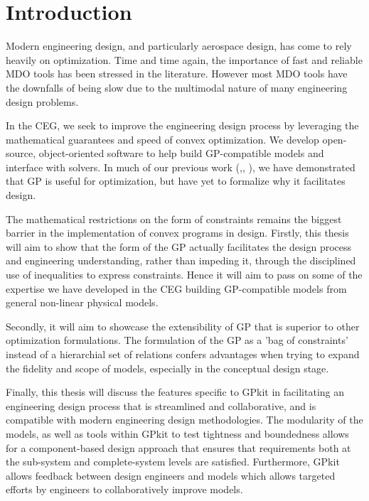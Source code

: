 \chapter{Introduction}

Modern engineering design, and particularly aerospace design, has come to rely
heavily on optimization. Time and time again, the importance of fast and
reliable MDO tools has been stressed in the literature. However most MDO tools
have the downfalls of being slow due to the multimodal nature of many
engineering design problems.
	
In the \gls{CEG}, we seek to improve the engineering design process by
leveraging the mathematical guarantees and speed of convex optimization. We develop
open-source, object-oriented software to help build \gls{GP}-compatible models and
interface with solvers. In much of our previous work
(\cite{gp_ac_design},\cite{SP_ac_design}, \cite{sp_engine}), we have demonstrated that
\gls{GP} is useful for optimization, but have yet to formalize why it
facilitates design.
 
The mathematical restrictions on the form of constraints remains the biggest
barrier in the implementation of convex programs in design. Firstly, this thesis
will aim to show that the form of the GP actually facilitates the design process
and engineering understanding, rather than impeding it, through the disciplined use
of inequalities to express constraints. Hence it will aim to
pass on some of the expertise we have developed in the \gls{CEG} building
\gls{GP}-compatible models from general non-linear physical models. 

Secondly, it will aim to showcase the extensibility of \gls{GP} that is superior 
to other optimization formulations. The formulation of the \gls{GP} as a 'bag of 
constraints' instead of a hierarchial set of relations confers advantages 
when trying to expand the fidelity and scope of models, especially in the 
conceptual design stage. 

Finally, this thesis will discuss the features specific to GPkit in facilitating
an engineering design process that is streamlined and collaborative, and is
compatible with modern engineering design methodologies. The modularity of the 
models, as well as tools within GPkit to test tightness and boundedness
allows for a component-based design approach that ensures that
requirements both at the sub-system and complete-system levels are satisfied. 
Furthermore, GPkit allows feedback between design engineers and models
which allows targeted efforts by engineers to collaboratively improve models.

